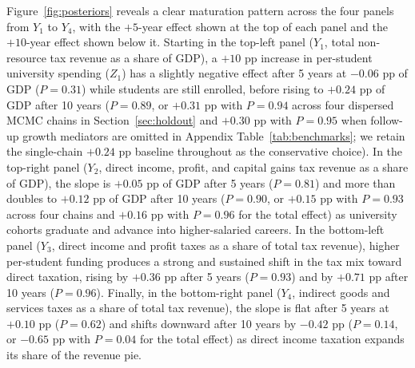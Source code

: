 \documentclass[11pt,a4paper]{article}
\begin{document}
Figure~\ref{fig:posteriors} reveals a clear maturation pattern across the four panels from $Y_1$ to $Y_4$, with the $+5$-year effect shown at the top of each panel and the $+10$-year effect shown below it. Starting in the top-left panel ($Y_1$, total non-resource tax revenue as a share of GDP), a $+10$ pp increase in per-student university spending ($Z_1$) has a slightly negative effect after 5 years at $-0.06$ pp of GDP ($P = 0.31$) while students are still enrolled, before rising to $+0.24$ pp of GDP after 10 years ($P = 0.89$, or $+0.31$ pp with $P = 0.94$ across four dispersed MCMC chains in Section~\ref{sec:holdout} and $+0.30$ pp with $P = 0.95$ when follow-up growth mediators are omitted in Appendix Table~\ref{tab:benchmarks}; we retain the single-chain $+0.24$ pp baseline throughout as the conservative choice). In the top-right panel ($Y_2$, direct income, profit, and capital gains tax revenue as a share of GDP), the slope is $+0.05$ pp of GDP after 5 years ($P = 0.81$) and more than doubles to $+0.12$ pp of GDP after 10 years ($P = 0.90$, or $+0.15$ pp with $P = 0.93$ across four chains and $+0.16$ pp with $P = 0.96$ for the total effect) as university cohorts graduate and advance into higher-salaried careers. In the bottom-left panel ($Y_3$, direct income and profit taxes as a share of total tax revenue), higher per-student funding produces a strong and sustained shift in the tax mix toward direct taxation, rising by $+0.36$ pp after 5 years ($P = 0.93$) and by $+0.71$ pp after 10 years ($P = 0.96$). Finally, in the bottom-right panel ($Y_4$, indirect goods and services taxes as a share of total tax revenue), the slope is flat after 5 years at $+0.10$ pp ($P = 0.62$) and shifts downward after 10 years by $-0.42$ pp ($P = 0.14$, or $-0.65$ pp with $P = 0.04$ for the total effect) as direct income taxation expands its share of the revenue pie.
\end{document}
